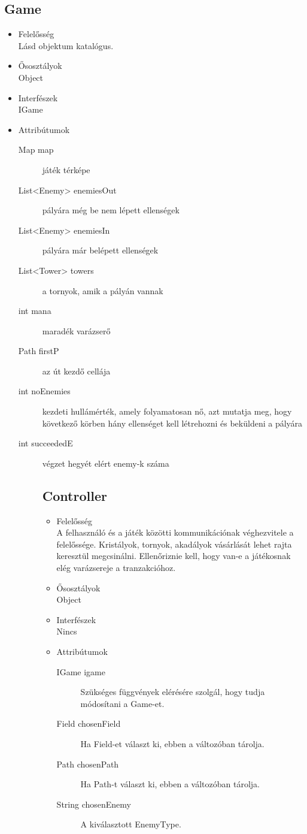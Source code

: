\subsection{Game}
\begin{itemize}
\item Felelősség\\
Lásd objektum katalógus.
\item Ősosztályok\\
Object
\item Interfészek\\
IGame
\item Attribútumok\\
	\begin{description}
		\item[Map map] játék térképe
\item[List<Enemy> enemiesOut] pályára még be nem lépett ellenségek
\item[List<Enemy> enemiesIn] pályára már belépett ellenségek
\item[List<Tower> towers] a tornyok, amik a pályán vannak
\item[int mana] maradék varázserő
\item[Path firstP] az út kezdő cellája
\item[int noEnemies] kezdeti hullámérték, amely folyamatosan nő, azt mutatja meg, hogy következő körben hány ellenséget kell létrehozni és beküldeni a pályára
\item[int succeededE] végzet hegyét elért enemy-k száma



\subsection{Controller}
\begin{itemize}
\item Felelősség\\
A felhasználó és a játék közötti kommunikációnak véghezvitele a felelőssége. Kristályok, tornyok, akadályok vásárlását lehet rajta keresztül megcsinálni. Ellenőriznie kell, hogy van-e a játékosnak elég varázsereje a tranzakcióhoz.
\item Ősosztályok\\
Object
\item Interfészek\\
Nincs
\item Attribútumok\\
	\begin{description}
		\item[IGame igame] Szükséges függvények elérésére szolgál, hogy tudja módosítani a Game-et. 
		\item[Field chosenField] Ha Field-et választ ki, ebben a változóban tárolja. 
		\item[Path chosenPath] Ha Path-t választ ki, ebben a változóban tárolja. 
		\item[String chosenEnemy] A kiválasztott EnemyType. 


\end{description}
\end{itemize}
\end{description}
\end{itemize}
